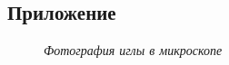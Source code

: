\documentclass[a4paper, fontsize = 14pt]{article}
\begin{document}
\subsection*{Приложение}

\begin{figure}[hbt]\label{risI}
\caption{\textit{Фотография иглы в микроскопе}}
\end{figure}
\end{document}
